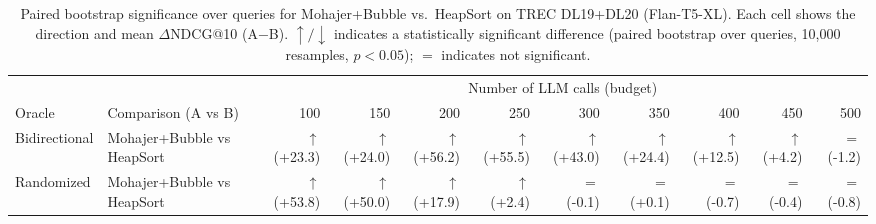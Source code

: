 \documentclass[11pt]{article}
\begin{document}
\begin{table}[H]
\centering
\scriptsize
\begin{adjustbox}{max width=\linewidth}
\begin{tabular}{llrrrrrrrrr}
\toprule
& & \multicolumn{9}{c}{Number of LLM calls (budget)} \\
\cmidrule(lr){3-11}
Oracle & Comparison (A vs B) & 100 & 150 & 200 & 250 & 300 & 350 & 400 & 450 & 500 \\
\midrule
Bidirectional & Mohajer+Bubble vs HeapSort & $\uparrow$ (+23.3) & $\uparrow$ (+24.0) & $\uparrow$ (+56.2) & $\uparrow$ (+55.5) & $\uparrow$ (+43.0) & $\uparrow$ (+24.4) & $\uparrow$ (+12.5) & $\uparrow$ (+4.2) & $=$ (-1.2) \\
Randomized    & Mohajer+Bubble vs HeapSort & $\uparrow$ (+53.8) & $\uparrow$ (+50.0) & $\uparrow$ (+17.9) & $\uparrow$ (+2.4) & $=$ (-0.1) & $=$ (+0.1) & $=$ (-0.7) & $=$ (-0.4) & $=$ (-0.8) \\
\bottomrule
\end{tabular}
\end{adjustbox}
\caption{Paired bootstrap significance over queries for Mohajer+Bubble vs.\ HeapSort on TREC DL19+DL20 (Flan-T5-XL). Each cell shows the direction and mean $\Delta$NDCG@10 (A$-$B). $\uparrow/\downarrow$ indicates a statistically significant difference (paired bootstrap over queries, 10,000 resamples, $p < 0.05$); $=$ indicates not significant.}
\label{tab:sig_vs_heapsort}
\end{table}


\FloatBarrier
\clearpage
\onecolumn
\end{document}

